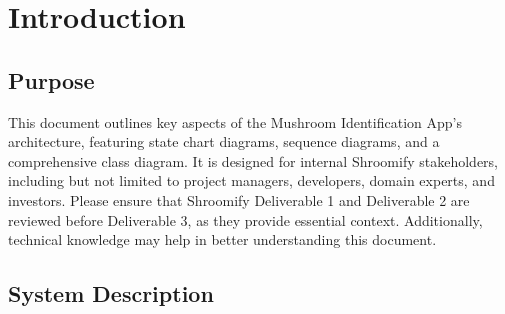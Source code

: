 \documentclass[]{article}
\begin{document}
\section{Introduction}
\label{sec:introduction}


\subsection{Purpose}
\label{sub:purpose}


This document outlines key aspects of the Mushroom Identification App’s architecture, featuring state chart diagrams, sequence diagrams, and a comprehensive class diagram. It is designed for internal Shroomify stakeholders, including but not limited to project managers, developers, domain experts, and investors. Please ensure that Shroomify Deliverable 1 and Deliverable 2 are reviewed before Deliverable 3, as they provide essential context. Additionally, technical knowledge may help in better understanding this document.

\subsection{System Description}
\label{sub:system_description}
\end{document}

